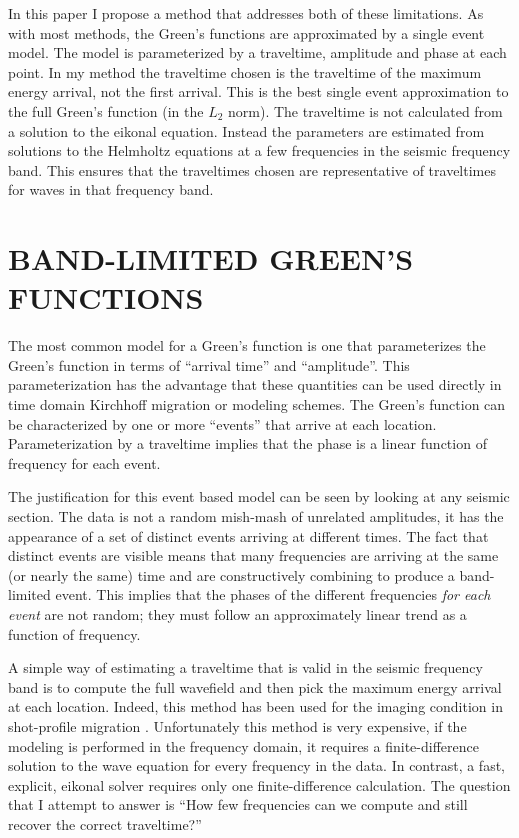 In this paper I propose a method that addresses both of these
limitations. As with most methods, the Green's functions are
approximated by a single event model. The model is parameterized by a
traveltime, amplitude and phase at each point. In my method the
traveltime chosen is the traveltime of the maximum energy arrival, not
the first arrival. This is the best single event approximation to the
full Green's function (in the $L_2$ norm). The traveltime is not
calculated from a solution to the eikonal equation. Instead the
parameters are estimated from solutions to the Helmholtz equations at
a few frequencies in the seismic frequency band. This ensures that the
traveltimes chosen are representative of traveltimes for waves in that
frequency band.

\section{BAND-LIMITED GREEN'S FUNCTIONS}

The most common model for a Green's function is one that parameterizes
the Green's function in terms of ``arrival time'' and ``amplitude''.
This parameterization has the advantage that these quantities can be
used directly in time domain Kirchhoff migration or modeling schemes.
The Green's function can be characterized by one or more ``events''
that arrive at each location. Parameterization by a traveltime implies
that the phase is a linear function of frequency for each event.

The justification for this event based model can be seen by looking at
any seismic section. The data is not a random mish-mash of
unrelated amplitudes, it has the appearance of a set of distinct
events arriving at different times. The fact that distinct events are
visible means that many frequencies are arriving at the same (or
nearly the same) time and are constructively combining to produce a
band-limited event. This implies that the phases of the different
frequencies {\em for each event} are not random; they must follow an
approximately linear trend as a function of frequency. 

A simple way of estimating a traveltime that is valid in the seismic
frequency band is to compute the full wavefield and then pick the
maximum energy arrival at each location. Indeed, this method has been
used for the imaging condition in shot-profile migration
\cite{GEO56.03.03780381}. Unfortunately this method is very expensive, if the
modeling is performed in the frequency domain, it requires a
finite-difference solution to the wave equation for every frequency in
the data. In contrast, a fast, explicit, eikonal solver
\cite{GEO56.06.08120821} requires only one finite-difference
calculation. The question that I attempt to answer is ``How few
frequencies can we compute and still recover the correct traveltime?''

